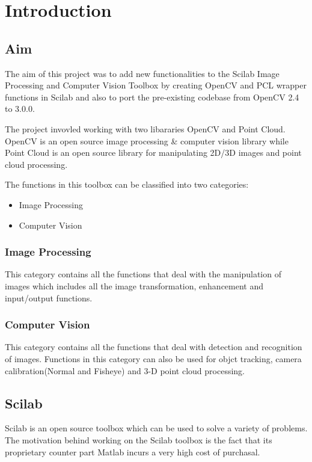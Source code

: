 \documentclass[12pt]{report}
\begin{document}
\tableofcontents


\chapter{Introduction}

\section{Aim}
\justify
The aim of this project was to add new functionalities to the Scilab Image Processing and Computer Vision
Toolbox by creating OpenCV and PCL wrapper functions in Scilab and also to port the pre-existing codebase
from OpenCV 2.4 to 3.0.0.

\justify
The project invovled working with two libararies OpenCV and Point Cloud. OpenCV is an open source image processing & computer 
vision library while Point Cloud is an open source library for manipulating 2D/3D images and point cloud processing.

\justify
The functions in this toolbox can be classified into two categories:
\begin{itemize}
	\item Image Processing
	\item Computer Vision
\end{itemize}

\subsection{Image Processing}
This category contains all the functions that deal with the manipulation of images which includes all the image
transformation, enhancement and input/output functions.

\subsection{Computer Vision}
This category contains all the functions that deal with detection and recognition of images. Functions in
this category can also be used for objct tracking, camera calibration(Normal and Fisheye) and 3-D point cloud processing.

\section{Scilab}
Scilab is an open source toolbox which can be used to solve a variety of problems.
The motivation behind working on the Scilab toolbox is  the fact that its proprietary counter part Matlab incurs
a very high cost of purchasal.
\end{document}
